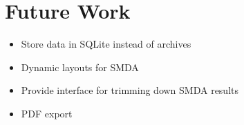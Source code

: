 \section{Future Work}
\label{sect:maw_future_work}

\begin{itemize}

    \item Store data in SQLite instead of archives

    \item Dynamic layouts for SMDA

    \item Provide interface for trimming down SMDA results

    \item PDF export

\end{itemize}
